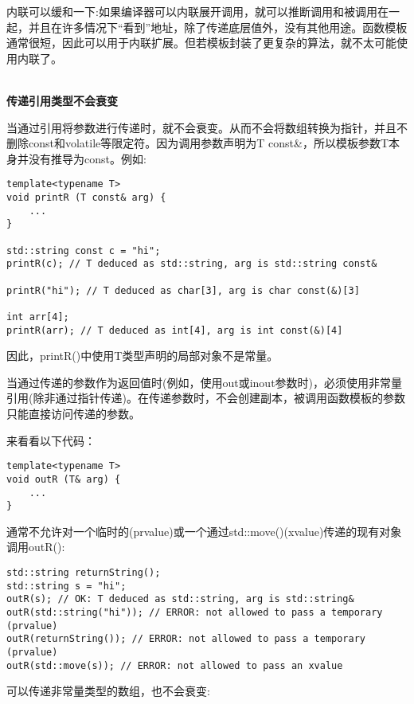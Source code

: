 内联可以缓和一下:如果编译器可以内联展开调用，就可以推断调用和被调用在一起，并且在许多情况下“看到”地址，除了传递底层值外，没有其他用途。函数模板通常很短，因此可以用于内联扩展。但若模板封装了更复杂的算法，就不太可能使用内联了。

\hspace*{\fill} \\ %
\noindent
\textbf{传递引用类型不会衰变}

当通过引用将参数进行传递时，就不会衰变。从而不会将数组转换为指针，并且不删除const和volatile等限定符。因为调用参数声明为T const\&，所以模板参数T本身并没有推导为const。例如:

\begin{lstlisting}[style=styleCXX]
template<typename T>
void printR (T const& arg) {
	...
}

std::string const c = "hi";
printR(c); // T deduced as std::string, arg is std::string const&

printR("hi"); // T deduced as char[3], arg is char const(&)[3]

int arr[4];
printR(arr); // T deduced as int[4], arg is int const(&)[4]
\end{lstlisting}

因此，printR()中使用T类型声明的局部对象不是常量。


当通过传递的参数作为返回值时(例如，使用out或inout参数时)，必须使用非常量引用(除非通过指针传递)。在传递参数时，不会创建副本，被调用函数模板的参数只能直接访问传递的参数。

来看看以下代码：

\begin{lstlisting}[style=styleCXX]
template<typename T>
void outR (T& arg) {
	...
}
\end{lstlisting}

通常不允许对一个临时的(prvalue)或一个通过std::move()(xvalue)传递的现有对象调用outR():

\begin{lstlisting}[style=styleCXX]
std::string returnString();
std::string s = "hi";
outR(s); // OK: T deduced as std::string, arg is std::string&
outR(std::string("hi")); // ERROR: not allowed to pass a temporary (prvalue)
outR(returnString()); // ERROR: not allowed to pass a temporary (prvalue)
outR(std::move(s)); // ERROR: not allowed to pass an xvalue
\end{lstlisting}

可以传递非常量类型的数组，也不会衰变:

